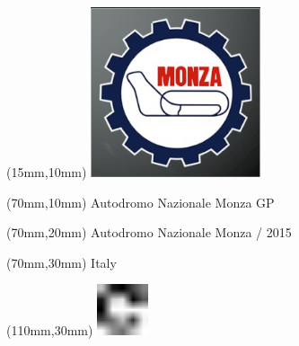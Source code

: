 \begin{textblock*}{50mm}(15mm,10mm)%
\includegraphics[width=50mm]{LG/2015-05-20_00086.png}
\end{textblock*}
\begin{textblock*}{130mm}(70mm,10mm)%
{\fontsize{20}{20}\selectfont Autodromo Nazionale Monza GP}\\
\end{textblock*}
\begin{textblock*}{120mm}(70mm,20mm)%
{\fontsize{16}{16}\selectfont Autodromo Nazionale Monza / 2015}\\
\end{textblock*}
\begin{textblock*}{120mm}(70mm,30mm)%
{\fontsize{12}{12}\selectfont Italy}
\end{textblock*}
\begin{textblock*}{30mm}(110mm,30mm)%
\centering
\includegraphics[height=15mm]{icons/fa-rotate-right.pdf}
\end{textblock*}
